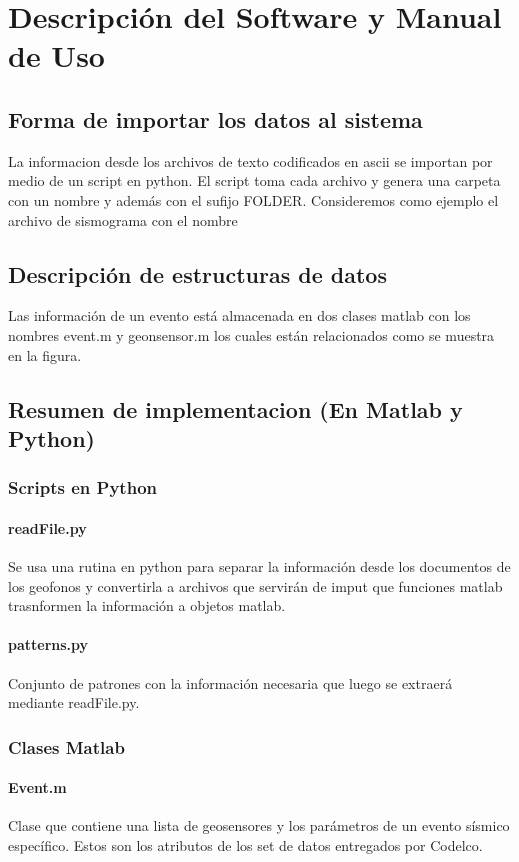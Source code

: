 \section{Descripción del Software y Manual de Uso}

\subsection{Forma de importar los datos al sistema}
La informacion desde los archivos de texto codificados en ascii se importan por
medio de un script en python. El script toma cada archivo y genera una carpeta
con un nombre y además con el sufijo FOLDER. Consideremos como ejemplo el
archivo de sismograma con el nombre
\subsection{Descripción de estructuras de datos}
Las información de un evento está almacenada en dos clases matlab con los
nombres event.m y geonsensor.m los cuales están relacionados como se muestra en
la figura. 

\subsection{Resumen de implementacion (En Matlab y Python)}

\subsubsection{Scripts en Python}
\paragraph{readFile.py}
Se usa una rutina en python para separar la información desde los documentos de
los geofonos y convertirla a archivos que servirán de imput que funciones matlab
trasnformen la información a objetos matlab.
\paragraph{patterns.py}
Conjunto de patrones con la información necesaria que luego se extraerá mediante
readFile.py.

\subsubsection{Clases Matlab}
\paragraph{Event.m}
Clase que contiene una lista de geosensores y los parámetros de un evento
sísmico específico. Estos son los atributos de los set de datos entregados
por Codelco.

